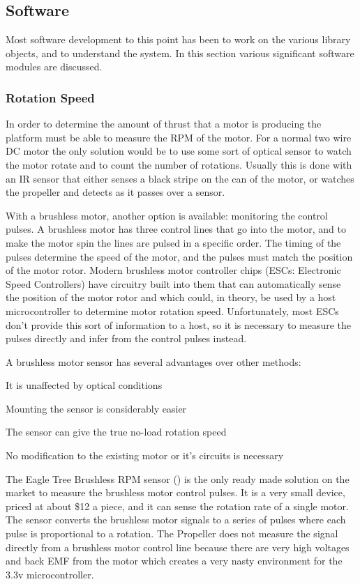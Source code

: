 \documentclass{article}
\numberwithin{equation}{section} %
\begin{document}
\subsection{Software}
Most software development to this point has been to work on the various library objects, and to understand the system. In this section various significant software modules are discussed.
\subsubsection{Rotation Speed}
In order to determine the amount of thrust that a motor is producing the platform must be able to measure the RPM of the motor. For a normal two wire DC motor the only solution would be to use some sort of optical sensor to watch the motor rotate and to count the number of rotations. Usually this is done with an IR sensor that either senses a black stripe on the can of the motor, or watches the propeller and detects as it passes over a sensor. 

With a brushless motor, another option is available: monitoring the control pulses. A brushless motor has three control lines that go into the motor, and to make the motor spin the lines are pulsed in a specific order. The  timing of the pulses determine the speed of the motor, and the pulses must match the position of the motor rotor. Modern brushless motor controller chips (ESCs: Electronic Speed Controllers) have circuitry built into them that can automatically sense the position of the motor rotor and which could, in theory, be used by a host microcontroller to determine motor rotation speed. Unfortunately, most ESCs don't provide this sort of information to a host, so it is necessary to measure the pulses directly and infer from the control pulses instead. 

A brushless motor sensor has several advantages over other methods:
\begin{list}{*}{}
	\item It is unaffected by optical conditions
	\item Mounting the sensor is considerably easier
	\item The sensor can give the true no-load rotation speed
	\item No modification to the existing motor or it's circuits is necessary
\end{list}

The Eagle Tree Brushless RPM sensor (\cite{eaglerpm}) is the only ready made solution on the market to measure the brushless motor control pulses. It is a very small device, priced at about \$12 a piece, and it can sense the rotation rate of a single motor. The sensor converts the brushless motor signals to a series of pulses where each pulse is proportional to a rotation. The Propeller does not measure the signal directly from a brushless motor control line because there are very high voltages and back EMF from the motor which creates a very nasty environment for the 3.3v microcontroller.
\end{document}
